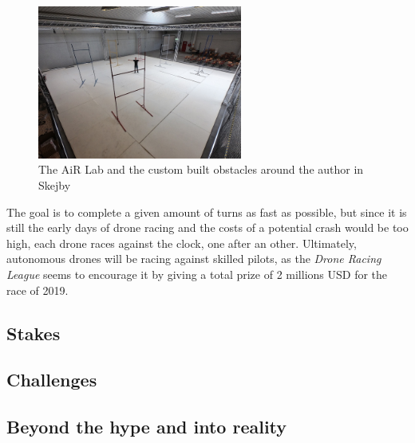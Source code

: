 \begin{figure}[h]
	\centering
	\includegraphics[width=0.6\textwidth]{figure/tiny_me.jpg}
	\caption{The AiR Lab and the custom built obstacles around the author in Skejby}
	\label{fig:mygates}
\end{figure}

The goal is to complete a given amount of turns as fast as possible, but since
it is still the early days of drone racing and the costs of a potential crash
would be too high, each drone races against the clock, one after an other.
Ultimately, autonomous drones will be racing against skilled pilots, as the
\emph{Drone Racing League} seems to encourage it by giving a total prize of 2
millions USD for the race of 2019.


\subsection{Stakes}

\subsection{Challenges}

\subsection{Beyond the hype and into reality}


